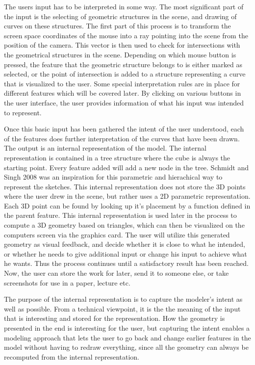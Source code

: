 \documentclass[a4paper,12pt]{report}
\begin{document}
The users input has to be interpreted in some way. The most significant part of the input is the selecting of geometric structures in the scene, and drawing of curves on these structures. The first part of this process is to transform the screen space coordinates of the mouse into a ray pointing into the scene from the position of the camera. This vector is then used to check for intersections with the geometrical structures in the scene. Depending on which mouse button is pressed, the feature that the geometric structure belongs to is either marked as selected, or the point of intersection is added to a structure representing a curve that is visualized to the user. Some special interpretation rules are in place for different features which will be covered later. By clicking on various buttons in the user interface, the user provides information of what his input was intended to represent.

Once this basic input has been gathered the intent of the user understood, each of the features does further interpretation of the curves that have been drawn. The output is an internal representation of the model. The internal representation is contained in a tree structure where the cube is always the starting point.  Every feature added will add a new node in the tree. Schmidt and Singh 2008 \cite{CGF:CGF1129} was an inspiration for this parametric and hierachical way to represent the sketches. This internal representation does not store the 3D points where the user drew in the scene, but rather uses a 2D parametric representation. Each 3D point can be found by looking up it's placement by a function defined in the parent feature. This internal representation is used later in the process to compute a 3D geometry based on triangles, which can then be visualized on the computers screen via the graphics card. The user will utilize this generated geometry as visual feedback, and decide whether it is close to 
what he intended, or whether he needs to give additional input or change his input to achieve what he wants. Thus the process continues until a satisfactory result has been reached. Now, the user can store the work for later, send it to someone else, or take screenshots for use in a paper, lecture etc.




The purpose of the internal representation is to capture the modeler's intent as well as possible. From a technical viewpoint, it is the the meaning of the input that is interesting and stored for the representation. How the geometry is presented in the end is interesting for the user, but capturing the intent enables a modeling approach that lets the user to go back and change earlier features in the model without having to redraw everything, since all the geometry can always be recomputed from the internal representation.
\end{document}
